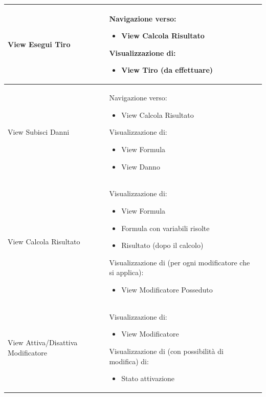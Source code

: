 \documentclass[a4paper, 11pt]{article}
\begin{document}
\begin{adjustwidth}{-1.5cm}{-1.5cm}
\begin{center}
\begin{longtable}{|p{5cm}|p{5cm}|p{5cm}|}
        View Esegui Tiro & Navigazione verso:
        \begin{itemize}
            \item View Calcola Risultato
        \end{itemize}
        Visualizzazione di:
        \begin{itemize}
            \item View Tiro (da effettuare)
        \end{itemize} &  \\ \hline
        
        View Subisci Danni & Navigazione verso:
        \begin{itemize}
            \item View Calcola Risultato
        \end{itemize}
        Visualizzazione di:
        \begin{itemize}
            \item View Formula
            \item View Danno
        \end{itemize} &  \\ \hline
        
        View Calcola Risultato &
        Visualizzazione di:
        \begin{itemize}
            \item View Formula
            \item Formula con variabili risolte
            \item Risultato (dopo il calcolo)
        \end{itemize}
        Visualizzazione di (per ogni modificatore che si applica):
        \begin{itemize}
            \item View Modificatore Posseduto
        \end{itemize} & \\ \hline
        
        View Attiva/Disattiva Modificatore & Visualizzazione di:
        \begin{itemize}
            \item View Modificatore
        \end{itemize}
        Visualizzazione di (con possibilità di modifica) di:
        \begin{itemize}
            \item Stato attivazione
        \end{itemize} &  \\ \hline


\end{longtable}
\end{center}
\end{adjustwidth}
\end{document}
